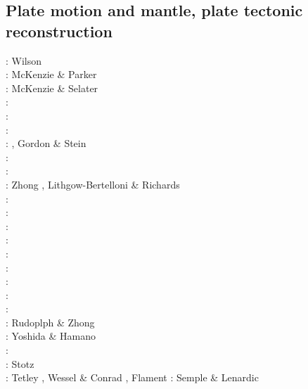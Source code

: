\subsection{Plate motion and mantle, plate tectonic reconstruction}

{\scriptsize
\nineteensixtysix: Wilson \cite{wils66}\\
\nineteensixtyseven: McKenzie \& Parker \cite{mcpa67}\\
\nineteenseventythree: McKenzie \& Selater \cite{mcse73}\\
\nineteenseventyfour: \cite{sosl74}\\
\nineteenseventyfive: \cite{harp75}\\
\nineteenninety: \cite{dega90}\\
\nineteenninetytwo: \cite{zieg92a}, Gordon \& Stein \cite{gost92}\\
\nineteenninetyfour: \cite{guto94}\\
\nineteenninetyseven: \cite{wean97b}\\
\nineteenninetyeight: Zhong \etal \cite{zhgm98}, Lithgow-Bertelloni \& Richards \cite{liri98}\\
\nineteenninetynine: \cite{ribr99}\\
\twothousandone: \cite{yohk01}\\
\twothousandtwo: \cite{stoc02}\\
\twothousandthree: \cite{evan03}\cite{reta03}\\
\twothousandseven: \cite{zhzl07}\\
\twothousandnine: \cite{lizh09}\cite{vasv09}\cite{iabu09}\cite{scbs09}\\
\twothousandten: \cite{stto10}\cite{dega10}\\
\twothousandtwelve: \cite{huss12}\cite{gutz12}\cite{qumm12}\cite{holr12}\cite{dost12}\cite{shbs12}\\
\twothousandthirteen: \cite{mosq13}\cite{cost13}\\
\twothousandfourteen: Rudoplph \& Zhong \cite{ruzh14} \\
\twothousandfifteen: Yoshida \& Hamano \cite{yoha15}\\
\twothousandsixteen: \cite{pric16}\\
\twothousandseventeen: Stotz \etal \cite{stid17}\\
\twothousandnineteen: Tetley \etal \cite{tewg19}, Wessel \& Conrad \cite{weco19}, 
                      Flament \cite{flam19}
\twothousandtwenty: Semple \& Lenardic \cite{sele20}
}

